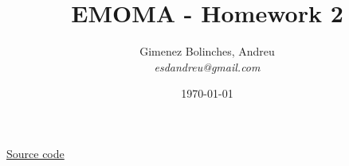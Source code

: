 \documentclass[12pt]{src/stem-report}
\title{EMOMA - Homework 2}
\author{
  Gimenez Bolinches, Andreu \\
  \textit{esdandreu@gmail.com} \\
}
\date{\today}
\begin{document}
  \hypersetup{linkcolor=black}

  \maketitle

  \begin{center}
    \href{https://gitlab.com/jemaro/wut/modelling-and-control-of-manipulators/control-homework}{Source code}
  \end{center}
  \clearpage

  \tableofcontents
  \clearpage


  \hypersetup{linkcolor=documentLinkColor}
  


  \singlespace
  \printbibliography[%
    title={References}%
  ]
\end{document}
